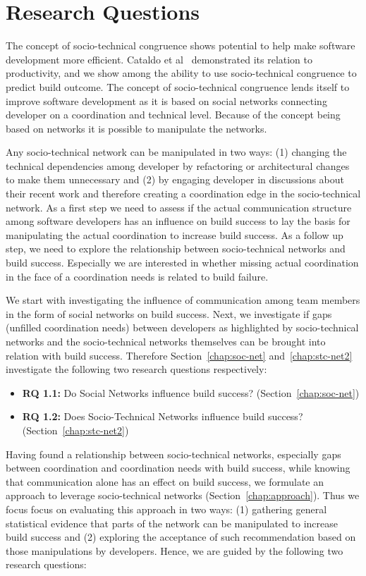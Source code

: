 \section{Research Questions}
The concept of socio-technical congruence shows potential to help make software development more efficient.
Cataldo et al~\cite{cataldo:cscw:2006} demonstrated its relation to productivity, and we show among the ability to use socio-technical congruence to predict build outcome.
The concept of socio-technical congruence lends itself to improve software development as it is based on social networks connecting developer on a coordination and technical level.
Because of the concept being based on networks it is possible to manipulate the networks.

Any socio-technical network can be manipulated in two ways: (1) changing the technical dependencies among developer by refactoring or architectural changes to make them unnecessary and (2) by engaging developer in discussions about their recent work and therefore creating a coordination edge in the socio-technical network.
As a first step we need to assess if the actual communication structure among software developers has an influence on build success to lay the basis for manipulating the actual coordination to increase build success.
As a follow up step, we need to explore the relationship between socio-technical networks and build success.
Especially we are interested in whether missing actual coordination in the face of a coordination needs is related to build failure.

We start with investigating the influence of communication among team members in the form of social networks on build success.
Next, we investigate if gaps (unfilled coordination needs) between developers as highlighted by socio-technical networks and the socio-technical networks themselves can be brought into relation with build success.
Therefore Section~\ref{chap:soc-net} and~\ref{chap:stc-net2} investigate the following two research questions respectively:

\begin{itemize}
  \item\textbf{RQ 1.1:} Do Social Networks influence build success? (Section~\ref{chap:soc-net})
  \item\textbf{RQ 1.2:} Does Socio-Technical Networks influence build success? (Section~\ref{chap:stc-net2})
\end{itemize}

Having found a relationship between socio-technical networks, especially gaps between coordination and coordination needs with build success, while knowing that communication alone has an effect on build success, we formulate an approach to leverage socio-technical networks (Section~\ref{chap:approach}).
Thus we focus focus on evaluating this approach in two ways:
(1) gathering general statistical evidence that parts of the network can be manipulated to increase build success and
(2) exploring the acceptance of such recommendation based on those manipulations by developers.
Hence, we are guided by the following two research questions:

